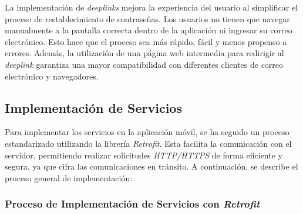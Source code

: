 La implementación de \textit{deeplinks} mejora la experiencia del usuario al simplificar el proceso de restablecimiento de contraseñas. Los usuarios no tienen que navegar manualmente a la pantalla correcta dentro de la aplicación ni ingresar su correo electrónico. Esto hace que el proceso sea más rápido, fácil y menos propenso a errores. Además, la utilización de una página web intermedia para redirigir al \textit{deeplink} garantiza una mayor compatibilidad con diferentes clientes de correo electrónico y navegadores.




\subsection{Implementación de Servicios}

Para implementar los servicios en la aplicación móvil, se ha seguido un proceso estandarizado utilizando la librería \textit{Retrofit}. Esta facilita la comunicación con el servidor, permitiendo realizar solicitudes \textit{HTTP/HTTPS} de forma eficiente y segura, ya que cifra las comunicaciones en tránsito. A continuación, se describe el proceso general de implementación:

\subsubsection{Proceso de Implementación de Servicios con \textit{Retrofit}}

